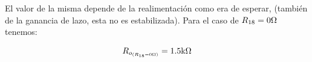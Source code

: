El valor de la misma depende de la realimentación como era de esperar, (también de la ganancia de lazo, esta no es estabilizada). Para el caso de $R_{18} = 0 \si[per-mode=symbol]{\ohm}$ tenemos:

\begin{equation*}
R_{o_{\left( R_{18} = 0 \si[per-mode=symbol]{\ohm} \right)}} = 1.5 \si[per-mode=symbol]{\kilo\ohm}
\end{equation*}
















